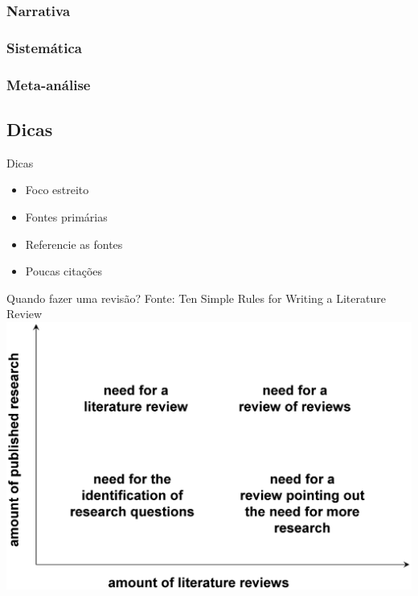 \documentclass{beamer}
\begin{document}
\subsubsection{Narrativa}

\subsubsection{Sistemática}

\subsubsection{Meta-análise}

\subsection{Dicas}

\begin{frame}{Dicas}
  \begin{itemize}
  \item Foco estreito
  \item Fontes primárias
  \item Referencie as fontes
  \item Poucas citações
  \end{itemize}
\end{frame}

\begin{frame}{Quando fazer uma revisão?}
Fonte: Ten Simple Rules for Writing a Literature Review
  \includegraphics[height=0.8\textheight]{Revisao_resumo/10_dicas_revisao}
\end{frame}
\end{document}
